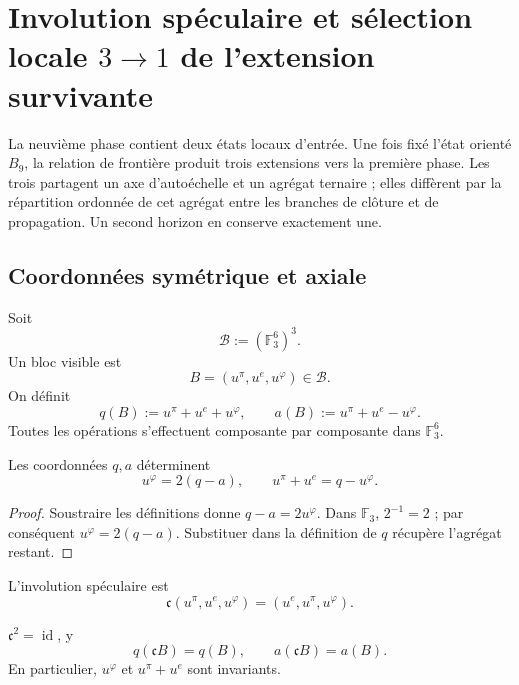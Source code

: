 
\chapter{Involution spéculaire et sélection locale \(3\to1\) de l'extension survivante}
\label{chap:espejo-seleccion-tres-uno}

La neuvième phase contient deux états locaux d'entrée. Une fois fixé
l'état orienté \(B_9\), la relation de frontière produit trois extensions
vers la première phase. Les trois partagent un axe d'autoéchelle et un agrégat
ternaire ; elles diffèrent par la répartition ordonnée de cet agrégat entre les branches de
clôture et de propagation. Un second horizon en conserve exactement une.

\section{Coordonnées symétrique et axiale}

Soit
\[
 \mathcal B:=(\mathbb F_3^6)^3.
\]
Un bloc visible est
\[
 B=(u^\pi,u^e,u^\varphi)\in\mathcal B.
\]
On définit
\[
 q(B):=u^\pi+u^e+u^\varphi,
 \qquad
 a(B):=u^\pi+u^e-u^\varphi.
\]
Toutes les opérations s'effectuent composante par composante dans
\(\mathbb F_3^6\).

\begin{theorem}
\label{thm:espejo-reconstruccion-eje-agregado}
Les coordonnées \(q,a\) déterminent
\[
 \boxed{u^\varphi=2(q-a),}
 \qquad
 \boxed{u^\pi+u^e=q-u^\varphi.}
\]
\end{theorem}

\begin{proof}
Soustraire les définitions donne
\(q-a=2u^\varphi\). Dans \(\mathbb F_3\), \(2^{-1}=2\) ; par conséquent
\(u^\varphi=2(q-a)\). Substituer dans la définition de \(q\) récupère
l'agrégat restant.
\end{proof}

L'involution spéculaire est
\[
 \mathfrak c(u^\pi,u^e,u^\varphi)
 =(u^e,u^\pi,u^\varphi).
\]

\begin{proposition}
\label{prop:espejo-invariantes}
\(\mathfrak c^2=\operatorname{id}\), y
\[
 q(\mathfrak cB)=q(B),
 \qquad
 a(\mathfrak cB)=a(B).
\]
En particulier, \(u^\varphi\) et \(u^\pi+u^e\) sont invariants.
\end{proposition}

